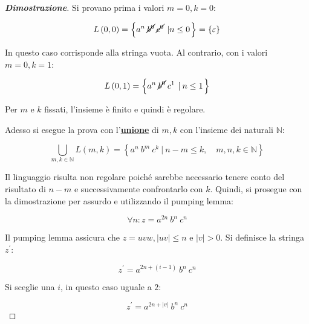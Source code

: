 \documentclass[a4paper]{article}
\begin{document}
	\begin{proof}[\textcolor{Blue3}{\textbf{Dimostrazione}}]
		Si provano prima i valori $m = 0, k = 0$:
		
		\begin{equation*}
			L\left(0,0\right) = \left\{a^{n} \: \cancel{b^{0}} \: \cancel{c^{0}} \: \left| n \le 0 \right.\right\} = \left\{\varepsilon\right\}
		\end{equation*}
	
		\noindent
		In questo caso corrisponde alla stringa vuota. Al contrario, con i valori $m = 0, k = 1$:
		
		\begin{equation*}
			L\left(0,1\right) = \left\{a^{n} \: \cancel{b^{0}} \: c^{1} \: \left| \: n \le 1 \right.\right\}
		\end{equation*}
		
		\noindent
		Per $m$ e $k$ fissati, l'insieme è finito e quindi è regolare.\newline
		
		\noindent
		Adesso si esegue la prova con l'\textbf{\underline{unione}} di $m,k$ con l'insieme dei naturali $\mathbb{N}$:
		
		\begin{equation*}
			\bigcup_{m,k \in \mathbb{N}} L\left(m,k\right) = \left\{a^{n} \: b^{m} \: c^{k} \: \left| \: n-m \le k, \hspace{1em} m,n,k \in \mathbb{N}\right.\right\}
		\end{equation*}
	
		\noindent
		Il linguaggio risulta non regolare poiché sarebbe necessario tenere conto del risultato di $n-m$ e successivamente confrontarlo con $k$. Quindi, si prosegue con la dimostrazione per assurdo e utilizzando il pumping lemma:
		
		\begin{equation*}
			\forall n : z = a^{2n} \: b^{n} \: c^{n}
		\end{equation*}
	
		\noindent
		Il pumping lemma assicura che $z = uvw, |uv| \le n$ e $|v| > 0$. Si definisce la stringa $z^{'}$:
		
		\begin{equation*}
			z^{'} = a^{2n + \left(i -1 \right)} \: b^{n} \: c^{n}
		\end{equation*}
	
		\noindent
		Si sceglie una $i$, in questo caso uguale a $2$:
		
		\begin{equation*}
			z^{'} = a^{2n + |v|} \: b^{n} \: c^{n}
		\end{equation*}
	

\end{proof}
\end{document}
